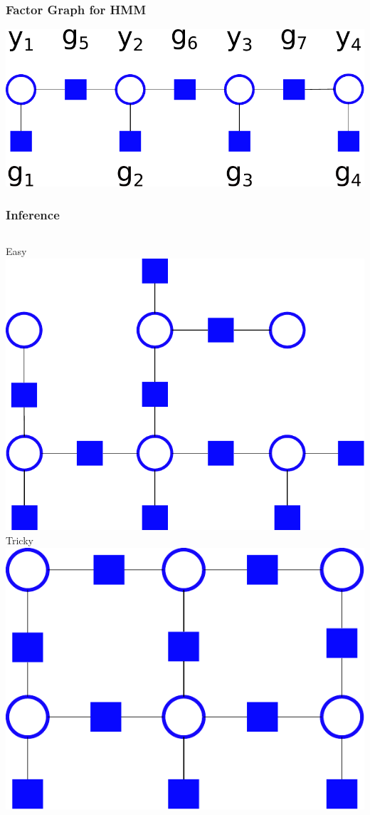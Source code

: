\documentclass[final,ignorenonframetext,compress]{beamer}
\begin{document}
\begin{frame}
    \frametitle{Factor Graph for HMM}
    \begin{center}
        \includegraphics[width=.8\textwidth]{images/hmm_white_bg}
    \end{center}
\end{frame}

\begin{frame}
    \frametitle{Inference}
    \begin{columns}[t]
        Easy\\
        \vspace{5mm}
        \includegraphics[width=.8\textwidth]{images/tree_white_bg}
        Tricky\\
        \vspace{5mm}
        \includegraphics[width=.8\textwidth]{images/grid_white_bg}
    \end{columns}
\end{frame}
\end{document}
